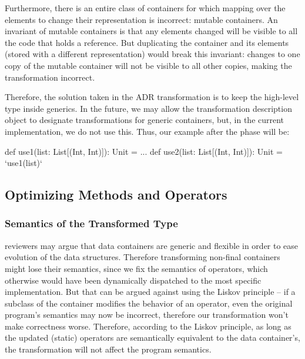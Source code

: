 Furthermore, there is an entire class of containers for which mapping over the elements to change their representation is incorrect: mutable containers. An invariant of mutable containers is that any elements changed will be visible to all the code that holds a reference. But duplicating the container and its elements (stored with a different representation) would break this invariant: changes to one copy of the mutable container will not be visible to all other copies, making the transformation incorrect.

Therefore, the solution taken in the ADR transformation is to keep the high-level type inside generics. In the future, we may allow the transformation description object to designate transformations for generic containers, but, in the current implementation, we do not use this. Thus, our example after the \commit{} phase will be:

\begin{lstlisting-nobreak}
def use1(list: List[(Int, Int)]): Unit = ...
def use2(list: List[(Int, Int)]): Unit = `use1(list)`
\end{lstlisting-nobreak}





\subsection{Optimizing Methods and Operators}
\label{sec:ildl:semantics}


\subsubsection{Semantics of the Transformed Type}
reviewers may argue that data containers are generic and flexible in order to ease evolution of the data structures. Therefore transforming non-final containers might lose their semantics, since we fix the semantics of operators, which otherwise would have been dynamically dispatched to the most specific implementation. But that can be argued against using the Liskov principle -- if a subclass of the container modifies the behavior of an operator, even the original program's semantics may now be incorrect, therefore our transformation won't make correctness worse. Therefore, according to the Liskov principle, as long as the updated (static) operators are semantically equivalent to the data container's, the transformation will not affect the program semantics.


